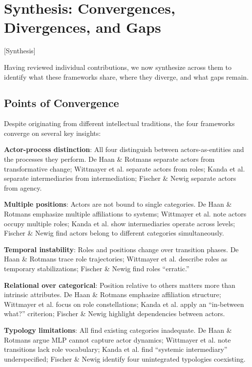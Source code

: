 \documentclass[../main.tex]{subfiles}
\begin{document}
\section{Synthesis: Convergences, Divergences, and Gaps}[Synthesis]

Having reviewed individual contributions, we now synthesize across them to identify what these frameworks share, where they diverge, and what gaps remain.


\subsection{Points of Convergence}

Despite originating from different intellectual traditions, the four frameworks converge on several key insights:

\textbf{Actor-process distinction}: All four distinguish between actors-as-entities and the processes they perform. De Haan \& Rotmans separate actors from transformative change; Wittmayer et al. separate actors from roles; Kanda et al. separate intermediaries from intermediation; Fischer \& Newig separate actors from agency.

\textbf{Multiple positions}: Actors are not bound to single categories. De Haan \& Rotmans emphasize multiple affiliations to systems; Wittmayer et al. note actors occupy multiple roles; Kanda et al. show intermediaries operate across levels; Fischer \& Newig find actors belong to different categories simultaneously.

\textbf{Temporal instability}: Roles and positions change over transition phases. De Haan \& Rotmans trace role trajectories; Wittmayer et al. describe roles as temporary stabilizations; Fischer \& Newig find roles ``erratic.''

\textbf{Relational over categorical}: Position relative to others matters more than intrinsic attributes. De Haan \& Rotmans emphasize affiliation structure; Wittmayer et al. focus on role constellations; Kanda et al. apply an ``in-between what?'' criterion; Fischer \& Newig highlight dependencies between actors.

\textbf{Typology limitations}: All find existing categories inadequate. De Haan \& Rotmans argue MLP cannot capture actor dynamics; Wittmayer et al. note transitions lack role vocabulary; Kanda et al. find ``systemic intermediary'' underspecified; Fischer \& Newig identify four unintegrated typologies coexisting.
\end{document}
